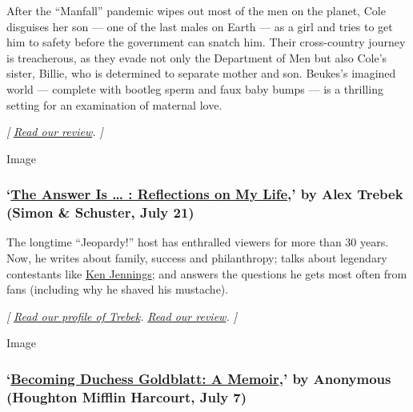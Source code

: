 After the ``Manfall'' pandemic wipes out most of the men on the planet,
Cole disguises her son --- one of the last males on Earth --- as a girl
and tries to get him to safety before the government can snatch him.
Their cross-country journey is treacherous, as they evade not only the
Department of Men but also Cole's sister, Billie, who is determined to
separate mother and son. Beukes's imagined world --- complete with
bootleg sperm and faux baby bumps --- is a thrilling setting for an
examination of maternal love.

\emph{{[}}
\href{https://www.nytimes.com/2020/07/24/books/review/lauren-beukes-afterland.html}{\emph{Read
our review}}\emph{. {]}}

Image

\hypertarget{the-answer-is---reflections-on-my-life-by-alex-trebek-simon--schuster-july-21}{%
\subsubsection{\texorpdfstring{`\href{https://www.simonandschuster.com/books/The-Answer-Is/Alex-Trebek/9781982157999}{The
Answer Is \ldots{} : Reflections on My Life},' by Alex Trebek (Simon \&
Schuster, July
21)}{`The Answer Is \ldots{} : Reflections on My Life,' by Alex Trebek (Simon \& Schuster, July 21)}}\label{the-answer-is---reflections-on-my-life-by-alex-trebek-simon--schuster-july-21}}

The longtime ``Jeopardy!'' host has enthralled viewers for more than 30
years. Now, he writes about family, success and philanthropy; talks
about legendary contestants like
\href{https://www.nytimes.com/2020/01/14/arts/television/jeopardy-goat-ken-jennings.html}{Ken
Jennings}; and answers the questions he gets most often from fans
(including why he shaved his mustache).

\emph{{[}}
\href{https://www.nytimes.com/2020/07/17/books/alex-trebek-jeopardy-the-answer-is.html}{\emph{Read
our profile of Trebek}}\emph{. \textbar{}}
\href{https://www.nytimes.com/2020/07/21/books/review-answer-is-alex-trebek-jeopardy-memoir.html}{\emph{Read
our review}}\emph{. {]}}

Image

\hypertarget{becoming-duchess-goldblatt-a-memoir-by-anonymous-houghton-mifflin-harcourt-july-7}{%
\subsubsection{\texorpdfstring{`\href{https://www.hmhbooks.com/shop/books/Becoming-Duchess-Goldblatt/9780358216773}{Becoming
Duchess Goldblatt: A Memoir},' by Anonymous (Houghton Mifflin Harcourt,
July
7)}{`Becoming Duchess Goldblatt: A Memoir,' by Anonymous (Houghton Mifflin Harcourt, July 7)}}\label{becoming-duchess-goldblatt-a-memoir-by-anonymous-houghton-mifflin-harcourt-july-7}}

